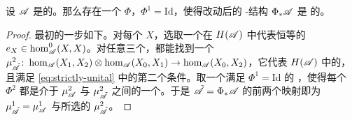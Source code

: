 \begin{lemma}\label{thm:strictly-unital-modification}
设 $\mathscr{A}$ 是\trCunital{}的\trACategory。那么存在一个\trFormalDiffeomorphism{}%
$\Phi$，$\Phi^1=\mathrm{Id}$，使得改动后的 \trAinfty-结构 $\Phi_*\mathscr{A}$ 是%
\trStrictlyUnital{}的。
\end{lemma}

\begin{proof}
最初的一步如下。对每个\trObject{} $X$，选取一个在 $H(\mathscr{A})$ 中代表恒等的%
\trCocycle{} $e_X\in\hom^0_{\mathscr{A}}(X,X)$。对任意三个\trObject，都能找到一个%
\trChainMap{}%
$\mu^2_{\tilde{\mathscr{A}}}\colon\hom_{\mathscr{A}}(X_1,X_2)\otimes\hom_{\mathscr{A}}(X_0,X_1)
\to\hom_{\mathscr{A}}(X_0,X_2)$，它代表 $H(\mathscr{A})$ 中的\trComposition，且满足
\eqref{eq:strictly-unital} 中的第二个条件。取一个满足 $\Phi^1=\mathrm{Id}$ 的%
\trFormalDiffeomorphism，使得每个 $\Phi^2$ 都是介于 $\mu^2_{\mathscr{A}}$ 与
$\mu^2_{\tilde{\mathscr{A}}}$ 之间的一个\trChainHomotopy。于是
$\tilde{\mathscr{A}}=\Phi_*\mathscr{A}$ 的前两个\trComposition{}映射即为
$\mu^1_{\tilde{\mathscr{A}}}=\mu^1_{\mathscr{A}}$ 与所选的 $\mu^2_{\tilde{\mathscr{A}}}$。


\end{proof}
